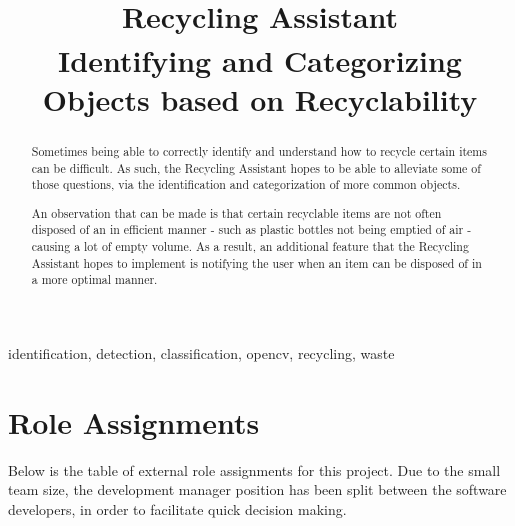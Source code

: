 \documentclass[conference]{IEEEtran}
\begin{document}
\title{Recycling Assistant\\
{\footnotesize \textsuperscript{}Identifying and Categorizing Objects based on Recyclability}
}

\author{
\and
{}
\and
{}
}

\maketitle

\begin{abstract}
Sometimes being able to correctly identify and understand how to recycle certain items can be difficult. As such, the Recycling Assistant hopes to be able to alleviate some of those questions, via the identification and categorization of more common objects.

An observation that can be made is that certain recyclable items are not often disposed of an in efficient manner - such as plastic bottles not being emptied of air - causing a lot of empty volume. As a result, an additional feature that the Recycling Assistant hopes to implement is notifying the user when an item can be disposed of in a more optimal manner.
\end{abstract}

\begin{IEEEkeywords}
identification, detection, classification, opencv, recycling, waste
\end{IEEEkeywords}

\section{Role Assignments}
Below is the table of external role assignments for this project. Due to the small team size, the development manager position has been split between the software developers, in order to facilitate quick decision making.
\newline
\end{document}
